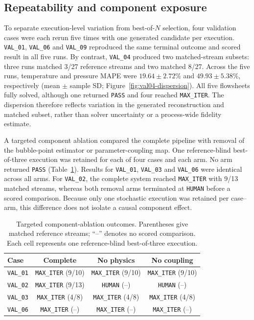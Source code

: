 
\subsection{Repeatability and component exposure}

To separate execution-level variation from best-of-$N$ selection, four
validation cases were each rerun five times with one generated candidate per
execution. \texttt{VAL\_01}, \texttt{VAL\_06} and \texttt{VAL\_09} reproduced
the same terminal outcome and scored result in all five runs. By contrast,
\texttt{VAL\_04} produced two matched-stream subsets: three runs matched 3/27
reference streams and two matched 8/27. Across the five runs, temperature and
pressure MAPE were $19.64\pm2.72\%$ and $49.93\pm5.38\%$, respectively (mean
$\pm$ sample SD; Figure~\ref{fig:val04-dispersion}). All five flowsheets fully
solved, although one returned \texttt{PASS} and four reached \texttt{MAX\_ITER}.
The dispersion therefore reflects variation in the generated reconstruction
and matched subset, rather than solver uncertainty or a process-wide fidelity
estimate.

A targeted component ablation compared the complete pipeline with removal of
the bubble-point estimator or parameter-coupling map. One reference-blind
best-of-three execution was retained for each of four cases and each arm.
No arm returned \texttt{PASS} (Table~\ref{tab:targeted-ablation}). Results for
\texttt{VAL\_01}, \texttt{VAL\_03} and \texttt{VAL\_06} were identical across
all arms. For \texttt{VAL\_02}, the complete system reached \texttt{MAX\_ITER}
with 9/13 matched streams, whereas both removal arms terminated at
\texttt{HUMAN} before a scored comparison. Because only one stochastic
execution was retained per case--arm, this difference does not isolate a
causal component effect.

\begin{table}[t]
\centering
\caption{Targeted component-ablation outcomes. Parentheses give matched
reference streams; ``--'' denotes no scored comparison. Each cell represents
one reference-blind best-of-three execution.}
\label{tab:targeted-ablation}
\scriptsize
\setlength{\tabcolsep}{2.5pt}
\begin{tabular}{@{}lccc@{}}
\toprule
Case & Complete & No physics & No coupling \\
\midrule
\texttt{VAL\_01} & \texttt{MAX\_ITER} (9/10) & \texttt{MAX\_ITER} (9/10) & \texttt{MAX\_ITER} (9/10) \\
\texttt{VAL\_02} & \texttt{MAX\_ITER} (9/13) & \texttt{HUMAN} (--) & \texttt{HUMAN} (--) \\
\texttt{VAL\_03} & \texttt{MAX\_ITER} (4/8) & \texttt{MAX\_ITER} (4/8) & \texttt{MAX\_ITER} (4/8) \\
\texttt{VAL\_06} & \texttt{MAX\_ITER} (--) & \texttt{MAX\_ITER} (--) & \texttt{MAX\_ITER} (--) \\
\bottomrule
\end{tabular}
\end{table}

